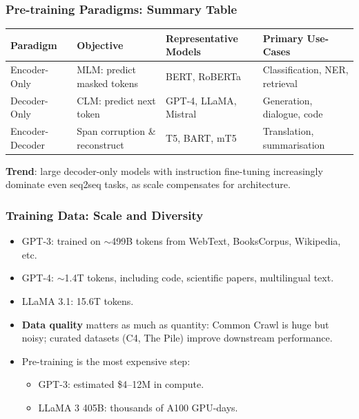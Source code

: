 \begin{frame}[fragile]\frametitle{Pre-training Paradigms: Summary Table}
\begin{center}
\small
\renewcommand{\arraystretch}{1.3}
\begin{tabular}{|p{2cm}|p{2cm}|p{2cm}|p{2cm}|}
\hline
\textbf{Paradigm} & \textbf{Objective} & \textbf{Representative Models} & \textbf{Primary Use-Cases} \\
\hline
Encoder-Only & MLM: predict masked tokens & BERT, RoBERTa & Classification, NER, retrieval \\
\hline
Decoder-Only & CLM: predict next token & GPT-4, LLaMA, Mistral & Generation, dialogue, code \\
\hline
Encoder-Decoder & Span corruption \& reconstruct & T5, BART, mT5 & Translation, summarisation \\
\hline
\end{tabular}
\end{center}

\vspace{0.4em}
\textbf{Trend}: large decoder-only models with instruction fine-tuning increasingly dominate even seq2seq tasks, as scale compensates for architecture.
\end{frame}

\begin{frame}[fragile]\frametitle{Training Data: Scale and Diversity}
\begin{itemize}
\item GPT-3: trained on $\sim$499B tokens from WebText, BooksCorpus, Wikipedia, etc.
\item GPT-4: $\sim$1.4T tokens, including code, scientific papers, multilingual text.
\item LLaMA 3.1: 15.6T tokens.
\item \textbf{Data quality} matters as much as quantity: Common Crawl is huge but noisy; curated datasets (C4, The Pile) improve downstream performance.
\item Pre-training is the most expensive step:
  \begin{itemize}
  \item GPT-3: estimated \$4–12M in compute.
  \item LLaMA 3 405B: thousands of A100 GPU-days.
  \end{itemize}
\end{itemize}
\end{frame}


